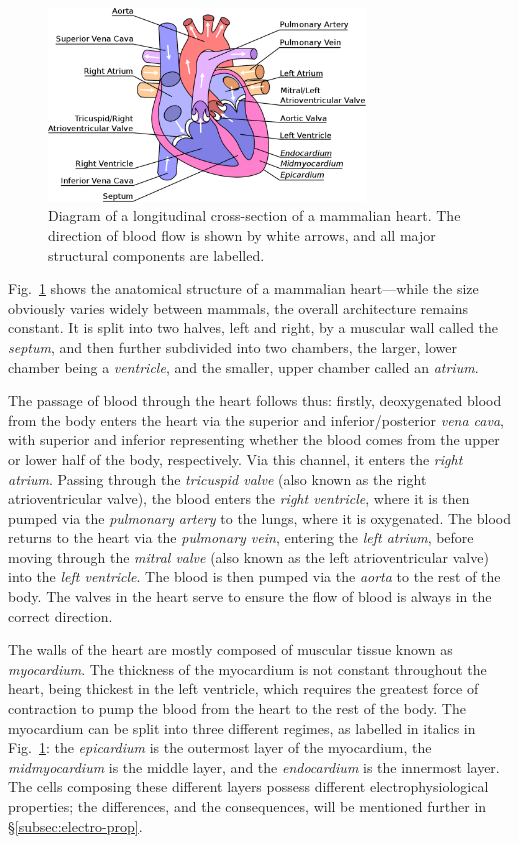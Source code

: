 \documentclass[../thesis-main.tex]{subfiles}
\begin{document}
\begin{figure}
 \centering
 \includegraphics[width=0.75\textwidth]{heart_labels}
 \caption[Structure of a mammalian heart]{Diagram of a longitudinal cross-section of a mammalian heart. The direction of blood flow is shown by white arrows, and all major structural components are labelled.}
 \label{fig:heart-structure}
\end{figure}
Fig.~\ref{fig:heart-structure} shows the anatomical structure of a mammalian heart---while the size obviously varies widely between mammals, the overall architecture remains constant. It is split into two halves, left and right, by a muscular wall called the \emph{septum}, and then further subdivided into two chambers, the larger, lower chamber being a \emph{ventricle}, and the smaller, upper chamber called an \emph{atrium}.

The passage of blood through the heart follows thus: firstly, deoxygenated blood from the body enters the heart via the superior and inferior/posterior \emph{vena cava}, with superior and inferior representing whether the blood comes from the upper or lower half of the body, respectively. Via this channel, it enters the \emph{right atrium}. Passing through the \emph{tricuspid valve} (also known as the right atrioventricular valve), the blood enters the \emph{right ventricle}, where it is then pumped via the \emph{pulmonary artery} to the lungs, where it is oxygenated. The blood returns to the heart via the \emph{pulmonary vein}, entering the \emph{left atrium}, before moving through the \emph{mitral valve} (also known as the left atrioventricular valve) into the \emph{left ventricle}. The blood is then pumped via the \emph{aorta} to the rest of the body. The valves in the heart serve to ensure the flow of blood is always in the correct direction.

The walls of the heart are mostly composed of muscular tissue known as \emph{myocardium}. The thickness of the myocardium is not constant throughout the heart, being thickest in the left ventricle, which requires the greatest force of contraction to pump the blood from the heart to the rest of the body. The myocardium can be split into three different regimes, as labelled in italics in Fig.~\ref{fig:heart-structure}: the \emph{epicardium} is the outermost layer of the myocardium, the \emph{midmyocardium} is the middle layer, and the \emph{endocardium} is the innermost layer. The cells composing these different layers possess different electrophysiological properties; the differences, and the consequences, will be mentioned further in \S\ref{subsec:electro-prop}.
\end{document}
